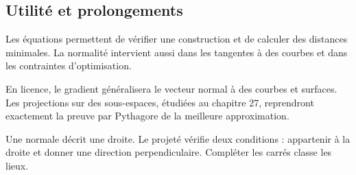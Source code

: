 \documentclass[../cours_1re.tex]{subfiles}
\begin{document}
\begin{finchapitre}
\section{Utilité et prolongements}
Les équations permettent de vérifier une construction et de calculer
des distances minimales. La normalité intervient aussi dans les tangentes
à des courbes et dans les contraintes d'optimisation.

En licence, le gradient généralisera le vecteur normal à des courbes et surfaces.
Les projections sur des sous-espaces, étudiées au chapitre 27, reprendront
exactement la preuve par Pythagore de la meilleure approximation.
\begin{retenir}
Une normale décrit une droite. Le projeté vérifie deux conditions :
appartenir à la droite et donner une direction perpendiculaire. Compléter les carrés classe les lieux.
\end{retenir}
\end{finchapitre}
\end{document}
